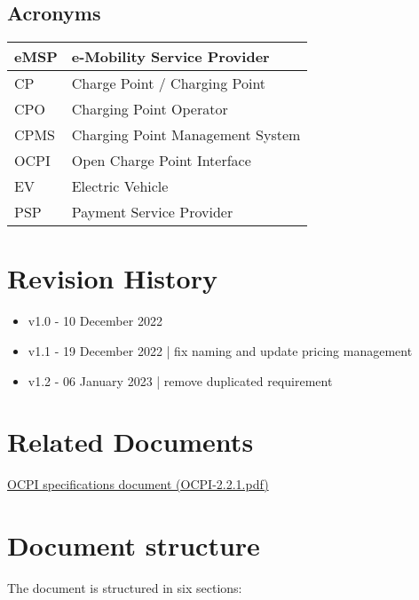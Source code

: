 \subsection{Acronyms}
\begin{tabular}{|l|l|}
	\hline
	eMSP & e-Mobility Service Provider\\
	\hline
	CP & Charge Point / Charging Point\\
	\hline
	CPO & Charging Point Operator\\
	\hline
	CPMS & Charging Point Management System\\
	\hline
	OCPI & Open Charge Point Interface\\
	\hline
	EV & Electric Vehicle\\
	\hline
	PSP & Payment Service Provider\\
	\hline
\end{tabular}

\section{Revision History}
\begin{itemize}
	\item v1.0 - 10 December 2022
	\item v1.1 - 19 December 2022 | fix naming and update pricing management
	\item v1.2 - 06 January 2023 | remove duplicated requirement
\end{itemize}

\section{Related Documents}
\href{../Specs/OCPI-2.2.1.pdf}{OCPI specifications document (OCPI-2.2.1.pdf)}

\section{Document structure}
The document is structured in six sections:

